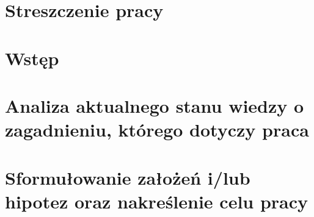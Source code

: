 \documentclass[12pt, letterpaper]{article}
\begin{document}
\newpage


\section{Streszczenie pracy}

\tableofcontents

\newpage


\section{Wstęp}


\section{Analiza aktualnego stanu wiedzy o zagadnieniu, którego dotyczy praca}


\section{Sformułowanie założeń i/lub hipotez oraz nakreślenie celu pracy}

\end{document}
